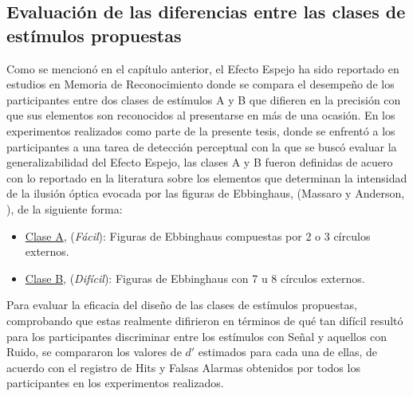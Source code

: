 \subsection{Evaluación de las diferencias entre las clases de estímulos propuestas}


Como se mencionó en el capítulo anterior, el Efecto Espejo ha sido reportado en estudios en Memoria de Reconocimiento donde se compara el desempeño de los participantes entre dos clases de estímulos A y B que difieren en la precisión con que sus elementos son reconocidos al presentarse en más de una ocasión. En los experimentos realizados como parte de la presente tesis, donde se enfrentó a los participantes a una tarea de detección perceptual con la que se buscó evaluar la generalizabilidad del Efecto Espejo, las clases A y B fueron definidas de acuero con lo reportado en la literatura sobre los elementos que determinan la intensidad de la ilusión óptica evocada por las figuras de Ebbinghaus, (Massaro y Anderson, \citeyear{Massaro1971}), de la siguiente forma: \\

\begin{itemize}
\item \underline{Clase A}, (\textit{Fácil}): Figuras de Ebbinghaus compuestas por 2 o 3 círculos externos.\\

\item \underline{Clase B}, (\textit{Difícil}): Figuras de Ebbinghaus con 7 u 8 círculos externos.\\
\end{itemize}

Para evaluar la eficacia del diseño de las clases de estímulos propuestas, comprobando que estas realmente difirieron en términos de qué tan difícil resultó para los participantes discriminar entre los estímulos con Señal y aquellos con Ruido, se compararon los valores de $d'$ estimados para cada una de ellas, de acuerdo con el registro de Hits y Falsas Alarmas obtenidos por todos los participantes en los experimentos realizados.\\


